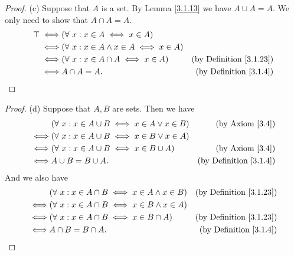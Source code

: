 \begin{proof}{(c)}
    Suppose that \(A\) is a set.
    By Lemma \ref{3.1.13} we have \(A \cup A = A\).
    We only need to show that \(A \cap A = A\).
    \begin{align*}
        \top \iff & (\forall\ x : x \in A \iff x \in A)                                                     \\
        \iff      & (\forall\ x : x \in A \land x \in A \iff x \in A)                                       \\
        \iff      & (\forall\ x : x \in A \cap A \iff x \in A)        & \text{(by Definition \ref{3.1.23})} \\
        \iff      & A \cap A = A.                                     & \text{(by Definition \ref{3.1.4})}
    \end{align*}
\end{proof}

\begin{proof}{(d)}
    Suppose that \(A, B\) are sets.
    Then we have
    \begin{align*}
             & (\forall\ x : x \in A \cup B \iff x \in A \lor x \in B) & \text{(by Axiom \ref{3.4})}        \\
        \iff & (\forall\ x : x \in A \cup B \iff x \in B \lor x \in A)                                      \\
        \iff & (\forall\ x : x \in A \cup B \iff x \in B \cup A)       & \text{(by Axiom \ref{3.4})}        \\
        \iff & A \cup B = B \cup A.                                    & \text{(by Definition \ref{3.1.4})}
    \end{align*}
    And we also have
    \begin{align*}
             & (\forall\ x : x \in A \cap B \iff x \in A \land x \in B) & \text{(by Definition \ref{3.1.23})} \\
        \iff & (\forall\ x : x \in A \cap B \iff x \in B \land x \in A)                                       \\
        \iff & (\forall\ x : x \in A \cap B \iff x \in B \cap A)        & \text{(by Definition \ref{3.1.23})} \\
        \iff & A \cap B = B \cap A.                                     & \text{(by Definition \ref{3.1.4})}
    \end{align*}
\end{proof}

